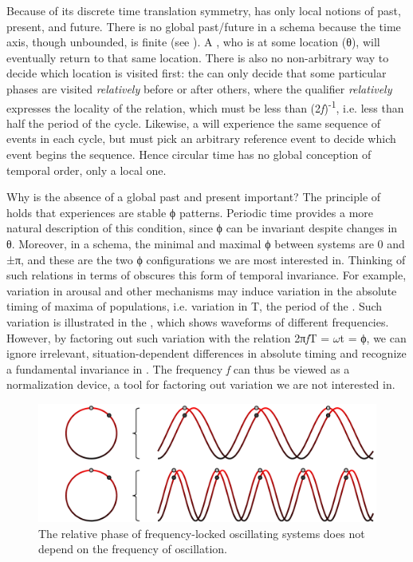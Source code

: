   Because of its discrete time translation symmetry,  has only local notions of past, present, and future. There is no global past/future in a  schema because the time axis, though unbounded, is finite (see {}). A , who is at some location (θ), will eventually return to that same location. There is also no non-arbitrary way to decide which location is visited first: the  can only decide that some particular phases are visited \textit{relatively} before or after others, where the qualifier \textit{relatively} expresses the locality of the relation, which must be less than (2\textit{f})\textsuperscript{{}-1}, i.e. less than half the period of the cycle. Likewise, a  will experience the same sequence of events in each cycle, but must pick an arbitrary reference event to decide which event begins the sequence. Hence circular time has no global conception of temporal order, only a local one. 

  Why is the absence of a global past and present important? The principle of  holds that  experiences are stable ϕ patterns. Periodic time provides a more natural description of this condition, since ϕ can be invariant despite changes in θ. Moreover, in a  schema, the minimal and maximal ϕ between systems are 0 and ±π, and these are the two ϕ configurations we are most interested in. Thinking of such relations in terms of  obscures this form of temporal invariance. For example, variation in arousal and other  mechanisms may induce variation in the absolute timing of  maxima of populations, i.e. variation in T, the period of the . Such variation is illustrated in the {}, which shows waveforms of different frequencies. However, by factoring out such variation with the relation 2π\textit{f}T = $\omega $t = ϕ, we can ignore irrelevant, situation-dependent differences in absolute timing and recognize a fundamental invariance in . The frequency \textit{f} can thus be viewed as a normalization device, a tool for factoring out variation we are not interested in.

  
\begin{figure}
\includegraphics[width=\textwidth]{figures/Tilsen-img48.png}
\caption{The relative phase of frequency-locked oscillating systems does not depend on the frequency of oscillation.}
\label{fig:3:20}
\end{figure}
 


